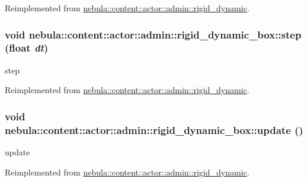 Reimplemented from \hyperlink{classnebula_1_1content_1_1actor_1_1admin_1_1rigid__dynamic_a6b7e8768902a320d8f7f483cf348a059}{nebula::content::actor::admin::rigid\_\-dynamic}.\hypertarget{classnebula_1_1content_1_1actor_1_1admin_1_1rigid__dynamic__box_a2989dba143de5dabded9ca32702cccaa}{
\subsubsection[{step}]{\setlength{\rightskip}{0pt plus 5cm}void nebula::content::actor::admin::rigid\_\-dynamic\_\-box::step (float {\em dt})}}
\label{classnebula_1_1content_1_1actor_1_1admin_1_1rigid__dynamic__box_a2989dba143de5dabded9ca32702cccaa}


step 

Reimplemented from \hyperlink{classnebula_1_1content_1_1actor_1_1admin_1_1rigid__dynamic_ae5350e2820c0e00c36c663fc63a8b83c}{nebula::content::actor::admin::rigid\_\-dynamic}.\hypertarget{classnebula_1_1content_1_1actor_1_1admin_1_1rigid__dynamic__box_ad0c1ca664351042f80ede5ed0a5bba0a}{
\subsubsection[{update}]{\setlength{\rightskip}{0pt plus 5cm}void nebula::content::actor::admin::rigid\_\-dynamic\_\-box::update ()}}
\label{classnebula_1_1content_1_1actor_1_1admin_1_1rigid__dynamic__box_ad0c1ca664351042f80ede5ed0a5bba0a}


update 

Reimplemented from \hyperlink{classnebula_1_1content_1_1actor_1_1admin_1_1rigid__dynamic_a2bf9e18773b7db87cb35fef56274405a}{nebula::content::actor::admin::rigid\_\-dynamic}.

